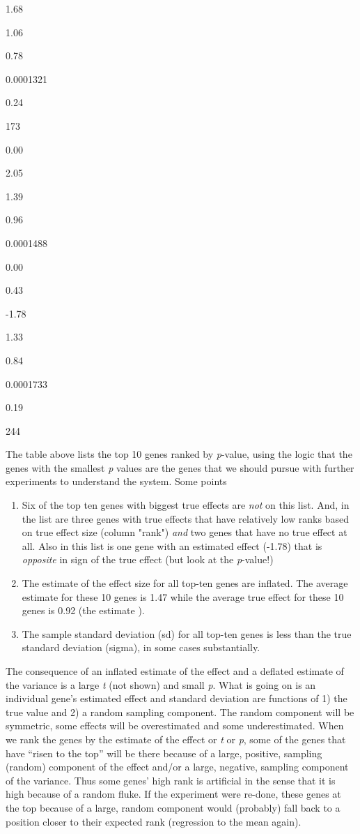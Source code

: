 \documentclass[]{book}
\providecommand{\tightlist}{%
  \setlength{\itemsep}{0pt}\setlength{\parskip}{0pt}}
\begin{document}
1.68

1.06

0.78

0.0001321

0.24

173

0.00

2.05

1.39

0.96

0.0001488

0.00

0.43

-1.78

1.33

0.84

0.0001733

0.19

244

The table above lists the top 10 genes ranked by \emph{p}-value, using the logic that the genes with the smallest \emph{p} values are the genes that we should pursue with further experiments to understand the system. Some points

\begin{enumerate}
\def\labelenumi{\arabic{enumi}.}
\tightlist
\item
  Six of the top ten genes with biggest true effects are \emph{not} on this list. And, in the list are three genes with true effects that have relatively low ranks based on true effect size (column "rank") \emph{and} two genes that have no true effect at all. Also in this list is one gene with an estimated effect (-1.78) that is \emph{opposite} in sign of the true effect (but look at the \emph{p}-value!)
\item
  The estimate of the effect size for all top-ten genes are inflated. The average estimate for these 10 genes is 1.47 while the average true effect for these 10 genes is 0.92 (the estimate ).
\item
  The sample standard deviation (sd) for all top-ten genes is less than the true standard deviation (sigma), in some cases substantially.
\end{enumerate}

The consequence of an inflated estimate of the effect and a deflated estimate of the variance is a large \emph{t} (not shown) and small \emph{p}. What is going on is an individual gene's estimated effect and standard deviation are functions of 1) the true value and 2) a random sampling component. The random component will be symmetric, some effects will be overestimated and some underestimated. When we rank the genes by the estimate of the effect or \emph{t} or \emph{p}, some of the genes that have ``risen to the top'' will be there because of a large, positive, sampling (random) component of the effect and/or a large, negative, sampling component of the variance. Thus some genes' high rank is artificial in the sense that it is high because of a random fluke. If the experiment were re-done, these genes at the top because of a large, random component would (probably) fall back to a position closer to their expected rank (regression to the mean again).
\end{document}
